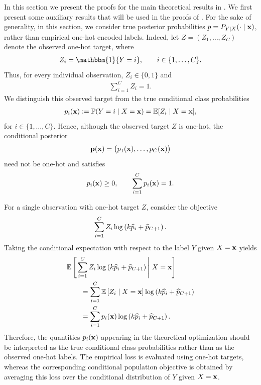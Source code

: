 In this section we present the proofs for the main theoretical results in . We first present some auxiliary results that will be used in the proofs of . For the sake of generality, in this section, we consider true posterior probabilities \(p=P_{Y|X}(\cdot\mid\mathbf{x})\), rather than empirical one-hot encoded labels. Indeed, let \(Z=(Z_1,\ldots,Z_C)\) denote the observed one-hot target, where
\begin{align}
    Z_i = \mathbbm{1}\{Y=i\},
    \qquad i\in\{1,\ldots,C\}.
\end{align}
Thus, for every individual observation, \(Z_i\in\{0,1\}\) and
\begin{align}
    \sum_{i=1}^{C} Z_i = 1.
\end{align}
We distinguish this observed target from the true conditional class
probabilities
\begin{align}
    p_i(\mathbf{x})
    := \mathbb{P}(Y=i\mid X=\mathbf{x})
    = \mathbb{E}[Z_i\mid X=\mathbf{x}],
\end{align}
for \(i\in\{1,\dots,C\}\).
Hence, although the observed target \(Z\) is one-hot, the conditional
posterior
\begin{align}
    \mathbf{p}(\mathbf{x})
    =
    \bigl(p_1(\mathbf{x}),\ldots,p_C(\mathbf{x})\bigr)
\end{align}
need not be one-hot and satisfies
\begin{align}
    p_i(\mathbf{x})\geq 0,
    \qquad
    \sum_{i=1}^{C}p_i(\mathbf{x})=1.
\end{align}

For a single observation with one-hot target \(Z\), consider the
objective
\begin{align}
    \sum_{i=1}^{C}
    Z_i
    \log\left(
    k\widehat{p}_i+\widehat{p}_{C+1}
    \right).
\end{align}
Taking the conditional expectation with respect to the label \(Y\)
given \(X=\mathbf{x}\) yields
\begin{align}
     & \mathbb{E}\left[
                     \left.
                     \sum_{i=1}^{C}
                     Z_i
                     \log\left(
                     k\widehat{p}_i+\widehat{p}_{C+1}
                     \right)
                     \,\right|\,X=\mathbf{x}
                     \right]
    \nonumber                                    \\
     & \qquad=
    \sum_{i=1}^{C}
    \mathbb{E}\left[
                  Z_i\mid X=\mathbf{x}
                  \right]
    \log\left(
    k\widehat{p}_i+\widehat{p}_{C+1}
    \right)
    \nonumber                                    \\
     & \qquad=
    \sum_{i=1}^{C}
    p_i(\mathbf{x})
    \log\left(
    k\widehat{p}_i+\widehat{p}_{C+1}
    \right).
\end{align}
Therefore, the quantities \(p_i(\mathbf{x})\) appearing in the theoretical
optimization should be interpreted as the true conditional class
probabilities rather than as the observed one-hot labels. The empirical
loss is evaluated using one-hot targets, whereas the corresponding
conditional population objective is obtained by averaging this loss
over the conditional distribution of \(Y\) given \(X=\mathbf{x}\).

